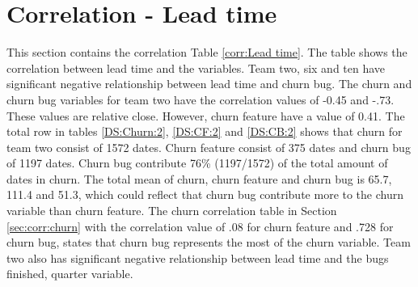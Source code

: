 \documentclass[UKenglish]{ifimaster}  %
\begin{document}
\section{Correlation - Lead time}
\label{sec:corr:lt}
This section contains the correlation Table \ref{corr:Lead time}. The table shows the correlation between lead time and the variables. Team two, six and ten have significant negative relationship between lead time and churn bug. The churn and churn bug variables for team two have the correlation values of  -0.45 and -.73. These values are relative close.  However, churn feature have a value of 0.41. The total row in tables \ref{DS:Churn:2}, \ref{DS:CF:2} and \ref{DS:CB:2} shows that churn for team two consist of 1572 dates. Churn feature consist of 375 dates and churn bug of 1197 dates. Churn bug contribute 76\%  (1197/1572) of the total amount of dates in churn. The total mean of churn, churn feature and churn bug is 65.7, 111.4 and 51.3, which could reflect that churn bug contribute more to the churn variable than churn feature. The churn correlation table in Section \ref{sec:corr:churn} with the correlation value of .08 for churn feature and .728 for churn bug, states that churn bug represents the most of the churn variable. Team two also has significant negative relationship between lead time and the bugs finished, quarter variable.
\end{document}
